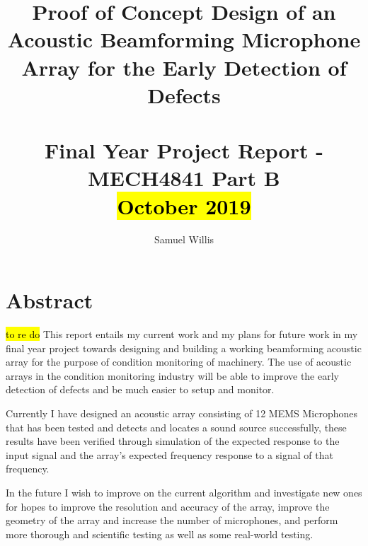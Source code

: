 \documentclass{UoNMCHA}
\numberwithin{equation}{section}
\begin{document}
\singlespacing
\title{Proof of Concept Design of an Acoustic Beamforming Microphone Array for the Early Detection of Defects \\ \ \\
{\small Final Year Project Report - MECH4841 Part B  \\\hl{October 2019}}}
\author[UoNMCHA]{Samuel Willis}
\address[UoNMCHA]{
Student of Mechanical Engineering,\\
The University of Newcastle, Callaghan, NSW 2308, AUSTRALIA \\
Student Number: 3256767 \\
E-mail: \href{mailto:s.willis@uon.edu.au}{\textsf{s.willis@uon.edu.au}}}
\maketitle
\onecolumn
\newpage
\vspace{-5mm}
\section*{Abstract}
\vspace{-3mm}
    \hl{to re do}
    This report entails my current work and my plans for future work in my final year project towards designing and building a working beamforming acoustic array for the purpose of condition monitoring of machinery. The use of acoustic arrays in the condition monitoring industry will be able to improve the early detection of defects and be much easier to setup and monitor.
    
    Currently I have designed an acoustic array consisting of 12 MEMS Microphones that has been tested and detects and locates a sound source successfully, these results have been verified through simulation of the expected response to the input signal and the array's expected frequency response to a signal of that frequency.
    
    In the future I wish to improve on the current algorithm and investigate new ones for hopes to improve the resolution and accuracy of the array, improve the geometry of the array and increase the number of microphones, and perform more thorough and scientific testing as well as some real-world testing.
\singlespacing
\newpage
\tableofcontents
\newpage
\listoftables
\listoffigures
\newpage
\end{document}
